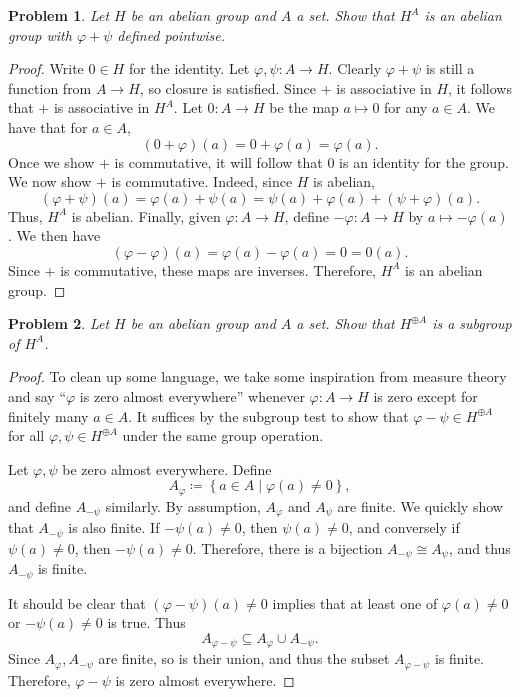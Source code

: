 \documentclass[11pt, letterpaper]{article}
\theoremstyle{plain}
\newtheorem{problem}{Problem}[section]
\begin{document}
\begin{problem}\label{9.1}
	Let $H$ be an abelian group and $A$ a set. Show that $H^A$ is an abelian group with $\varphi +\psi $ defined pointwise.
\end{problem}
\begin{proof}
	Write $0\in H$ for the identity. Let $\varphi ,\psi : A \to H$. Clearly $\varphi +\psi $ is still a function from $A\to H$, so closure is satisfied. Since $+$ is associative in $H$, it follows that $+$ is associative in $H^A$. Let $0: A \to H$ be the map $a\mapsto 0$ for any $a\in A$. We have that for $a\in A$,
	\[
		(0+\varphi )(a)=0+\varphi (a)=\varphi (a)
	.\]
	Once we show $+$ is commutative, it will follow that $0$ is an identity for the group. We now show $+$ is commutative. Indeed, since $H$ is abelian,
	\[
		(\varphi +\psi )(a)=\varphi (a)+\psi (a)=\psi (a)+\varphi (a)+(\psi +\varphi )(a)
	.\]
	Thus, $H^A$ is abelian. Finally, given $\varphi : A \to H$, define $-\varphi : A \to H$ by $a\mapsto -\varphi (a)$. We then have
	\[
		(\varphi -\varphi )(a)=\varphi (a)-\varphi (a)=0=0(a)
	.\]
	Since $+$ is commutative, these maps are inverses. Therefore, $H^A$ is an abelian group.
\end{proof}

\begin{problem}\label{9.2}
	Let $H$ be an abelian group and $A$ a set. Show that $H^{\oplus A} $ is a subgroup of $H^A$.
\end{problem}
\begin{proof}
	To clean up some language, we take some inspiration from measure theory and say ``$\varphi $ is zero almost everywhere'' whenever $\varphi : A \to H$ is zero except for finitely many $a\in A$. It suffices by the subgroup test to show that $\varphi -\psi \in H^{\oplus A} $ for all $\varphi ,\psi \in H^{\oplus A} $ under the same group operation.

	Let $\varphi ,\psi $ be zero almost everywhere. Define
	\[
		A_{\varphi } \coloneqq \left\{ a\in A\mid \varphi (a)\neq 0 \right\} ,
	\]
	and define $A_{-\psi } $ similarly. By assumption, $A_\varphi $ and $A_{\psi }$ are finite. We quickly show that $A_{-\psi } $ is also finite. If $-\psi (a)\neq 0$, then $\psi (a)\neq 0$, and conversely if $\psi (a)\neq 0$, then $-\psi (a)\neq 0$. Therefore, there is a bijection $A_{-\psi } \cong A_{\psi } $, and thus $A_{-\psi } $ is finite.

	It should be clear that $(\varphi -\psi )(a)\neq 0$ implies that at least one of $\varphi (a)\neq 0$ or $-\psi (a)\neq 0$ is true. Thus
	\[
		A_{\varphi -\psi } \subseteq A_\varphi \cup A_{-\psi } 
	.\]
	Since $A_\varphi ,A_{-\psi } $ are finite, so is their union, and thus the subset $A_{\varphi -\psi } $ is finite. Therefore, $\varphi -\psi $ is zero almost everywhere.
\end{proof}
\end{document}
